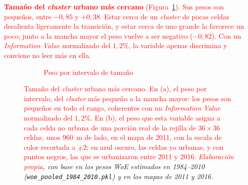 \textcolor{red}{\textbf{Tamaño del \textit{cluster} urbano más cercano} (Figura~\ref{fig:woe-cluster}). Sus
pesos son pequeños, entre $-0{,}85$ y $+0{,}38$. Estar cerca de un
\textit{cluster} de pocas celdas desalienta ligeramente la transición, y estar
cerca de uno grande la favorece un poco; junto a la mancha mayor el peso
vuelve a ser negativo ($-0{,}82$). Con un \textit{Information Value}
normalizado del $1{,}2\%$, la variable apenas discrimina y conviene no leer
más en ella.}

\begin{figure}[htbp]
  \centering
  \shorthandoff{<>}%
  \begin{subfigure}[b]{0.56\linewidth}
  \centering
  \caption{\textcolor{red}{Peso por intervalo de tamaño}}
  \end{subfigure}\hfill
  \begin{subfigure}[b]{0.40\linewidth}
  \centering
  \end{subfigure}
  \caption{\textcolor{red}{Tamaño del \textit{cluster} urbano más cercano. En (a), el peso por intervalo, del \textit{cluster} más pequeño a la mancha mayor: los pesos son pequeños en todo el rango, coherentes con un \textit{Information Value} normalizado del $1{,}2\%$. En (b), el peso que esta variable asigna a cada celda no urbana de una porción real de la rejilla de $36\times36$ celdas, unos $960$~m de lado, en el mapa de 2011, con la escala de color recortada a $\pm2$; en azul oscuro, las celdas ya urbanas, y con puntos negros, las que se urbanizaron entre 2011 y 2016.} \textit{\textcolor{red}{Elaboración propia}, con base en los pesos WoE estimados en 1984--2010 (\texttt{woe\_pooled\_1984\_2010.pkl}) y en los mapas de 2011 y 2016.}}
  \label{fig:woe-cluster}
\end{figure}


